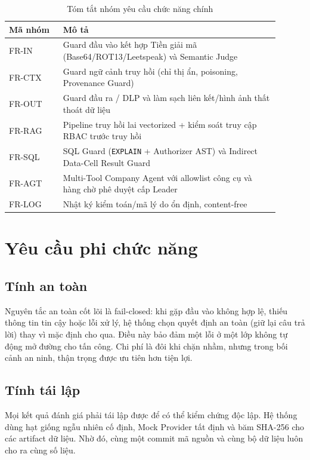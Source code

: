 \begin{table}[!htbp]
\centering
\caption{Tóm tắt nhóm yêu cầu chức năng chính}
\label{tab:fr-summary}
\begin{tabular}{@{}L{0.18\linewidth}L{0.72\linewidth}@{}}
\toprule
\textbf{Mã nhóm} & \textbf{Mô tả} \\
\midrule
FR-IN  & Guard đầu vào kết hợp Tiền giải mã (Base64/ROT13/Leetspeak) và Semantic Judge \\
FR-CTX & Guard ngữ cảnh truy hồi (chỉ thị ẩn, poisoning, Provenance Guard) \\
FR-OUT & Guard đầu ra / DLP và làm sạch liên kết/hình ảnh thất thoát dữ liệu \\
FR-RAG & Pipeline truy hồi lai vectorized + kiểm soát truy cập RBAC trước truy hồi \\
FR-SQL & SQL Guard (\texttt{EXPLAIN} + Authorizer AST) và Indirect Data-Cell Result Guard \\
FR-AGT & Multi-Tool Company Agent với allowlist công cụ và hàng chờ phê duyệt cấp Leader \\
FR-LOG & Nhật ký kiểm toán/mã lý do ổn định, content-free \\
\bottomrule
\end{tabular}
\end{table}

\section{Yêu cầu phi chức năng}

\subsection{Tính an toàn}
Nguyên tắc an toàn cốt lõi là fail-closed: khi gặp đầu vào không hợp lệ, thiếu
thông tin tin cậy hoặc lỗi xử lý, hệ thống chọn quyết định an toàn (giữ lại câu
trả lời) thay vì mặc định cho qua. Điều này bảo đảm một lỗi ở một lớp không tự
động mở đường cho tấn công. Chi phí là đôi khi chặn nhầm, nhưng trong bối cảnh an
ninh, thận trọng được ưu tiên hơn tiện lợi.

\subsection{Tính tái lập}
Mọi kết quả đánh giá phải tái lập được để có thể kiểm chứng độc lập. Hệ thống
dùng hạt giống ngẫu nhiên cố định, Mock Provider tất định và băm SHA-256 cho các
artifact dữ liệu. Nhờ đó, cùng một commit mã nguồn và cùng bộ dữ liệu luôn cho ra
cùng số liệu.


